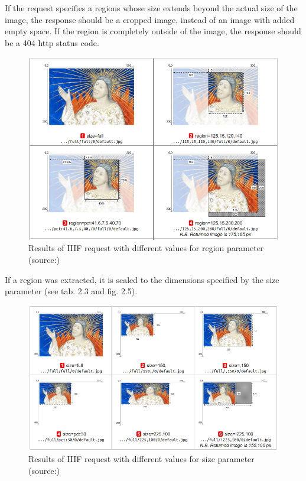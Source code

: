 If the request specifies a regions whose size extends beyond the actual size of the image, the response should be a cropped image, instead of an image with added empty space. If the region is completely outside of the image, the response should be a 404 http status code\cite{web:iiif}.

\begin{figure}[H]
	\begin{center}
		\includegraphics[scale=0.4]{img/region_param.png}
		\caption{Results of IIIF request with different values for region parameter (source:\cite{web:iiif})}
		\label{fig:fig2.4}
	\end{center}
\end{figure}

If a region was extracted, it is scaled to the dimensions specified by the size parameter (see tab. 2.3 and fig. 2.5).

\begin{figure}[H]
	\begin{center}
		\includegraphics[scale=0.35]{img/size_parameter.png}
		\caption{Results of IIIF request with different values for size parameter (source:\cite{web:iiif})}
		\label{fig:fig2.5}
	\end{center}
\end{figure}

